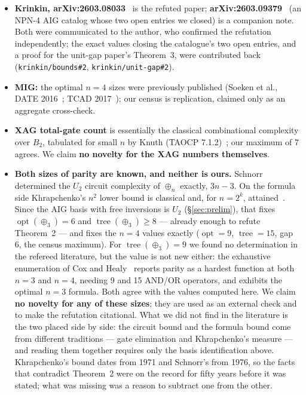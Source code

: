 \documentclass[11pt]{article}
\DeclareMathOperator{\opt}{opt}
\DeclareMathOperator{\tree}{tree}
\theoremstyle{plain}
\begin{document}
\begin{itemize}
  \item \textbf{Krinkin, arXiv:2603.08033}~\cite{krinkin-unitgap} is the refuted paper;
  \textbf{arXiv:2603.09379}~\cite{krinkin-catalog} (an NPN-4 AIG catalog whose two open entries we
  closed) is a companion note. Both were communicated to the author, who
  confirmed the refutation independently; the exact values closing the catalogue's two open
  entries, and a proof for the unit-gap paper's Theorem~3, were contributed back
  (\texttt{krinkin/bounds\#2}, \texttt{krinkin/unit-gap\#2}).

  \item \textbf{MIG:} the optimal $n = 4$ sizes were previously published (Soeken et al., DATE
  2016~\cite{soeken2016}; TCAD 2017~\cite{soeken2017}); our census is replication, claimed only as
  an aggregate cross-check.

  \item \textbf{XAG total-gate count} is essentially the classical combinational complexity over
  $B_2$, tabulated for small $n$ by Knuth (TAOCP 7.1.2)~\cite{knuth-taocp4a}; our maximum of 7
  agrees. We claim \textbf{no novelty for the XAG numbers themselves}.

  \item \textbf{Both sizes of parity are known, and neither is ours.} Schnorr~\cite{schnorr1976}
  determined the $U_2$ circuit complexity of $\oplus_n$ exactly, $3n-3$. On the formula side
  Khrapchenko's $n^2$ lower bound is classical and, for $n = 2^k$, attained~\cite{tarui2010}.
  Since the AIG basis with free inversions is $U_2$ (\S\ref{sec:prelim}), that fixes
  $\opt(\oplus_3) = 6$ and $\tree(\oplus_3) \ge 8$ --- already enough to refute Theorem~2 --- and
  fixes the $n = 4$ values exactly ($\opt = 9$, $\tree = 15$, gap 6, the census maximum). For
  $\tree(\oplus_3) = 9$ we found no determination in the refereed literature, but the value is not
  new either: the exhaustive enumeration of Cox and Healy~\cite{cox2011} reports parity as a
  hardest function at both $n = 3$ and $n = 4$, needing 9 and 15 AND/OR operators, and exhibits
  the optimal $n = 3$ formula. Both agree with the values computed here. We claim \textbf{no
  novelty for any of these sizes}; they are used as an external check and to make the refutation
  citational. What
  we did not find in the literature is the two placed side by side: the circuit bound and the
  formula bound come from different traditions --- gate elimination and Khrapchenko's measure ---
  and reading them together requires only the basis identification above. Khrapchenko's bound
  dates from 1971 and Schnorr's from 1976, so the facts that contradict Theorem~2 were on the
  record for fifty years before it was stated; what was missing was a reason to subtract one
  from the other.


\end{itemize}
\end{document}
